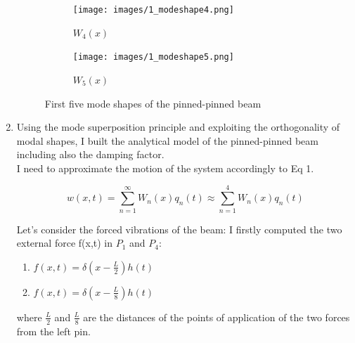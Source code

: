 \documentclass[11pt,a4paper]{article}
\begin{document}
\begin{enumerate}
	\begin{figure}[H]
		\begin{subfigure}[b]{0.5\textwidth}
			\centering
			\texttt{[image: images/1\_modeshape4.png]}
			\caption{$W_4(x)$}
		\end{subfigure}
		\hfill
		\begin{subfigure}[b]{0.5\textwidth}
			\centering
			\texttt{[image: images/1\_modeshape5.png]}
			\caption{$W_5(x)$}
		\end{subfigure}
		\caption{First five mode shapes of the pinned-pinned beam}
	\end{figure}

	
	\medskip
	
	\item Using the mode superposition principle and exploiting the orthogonality of modal shapes, I built the analytical model of the pinned-pinned beam including also the damping factor.\\
	I need to approximate the motion of the system accordingly to Eq 1.
	
	\begin{equation}
	w(x,t)=\sum_{n=1}^{\infty} W_{n}(x) q_{n}(t) \approx \sum_{n=1}^{4} W_{n}(x) q_{n}(t)
	\end{equation}
	
	\newpage
	
	Let's consider the forced vibrations of the beam: I firstly computed the two external force f(x,t) in $P_1$ and $P_4$:
	\begin{enumerate}
		\item $f(x,t)=\delta(x-\frac{L}{2})h(t)$
		\item $f(x,t)=\delta(x-\frac{L}{8})h(t)$
	\end{enumerate}	
	where $\frac{L}{2}$ and $\frac{L}{8}$ are the distances of the points of application of the two forces from the left pin.
	
	\smallskip
	

\end{enumerate}
\end{document}
